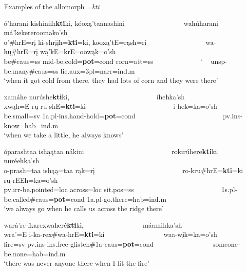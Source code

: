 \largerpage
\begin{exe}

\item\label{potentialkti} Examples of the allomorph =\textit{kti}

	\begin{xlist}
	
	\item\label{potentialkti1}
	\glll ó'harani kishiniih\textbf{kti}ki, kóoxą'taanashini ~ ~ ~ ~ ~ ~ ~ ~ ~ ~ wahų́harani má'kekereroomako'sh\\
	o'\#hrE=rį ki-shrįįh=\textbf{kti}=ki, kooxą'tE=rąsh=rį ~ ~ ~ ~ ~ ~ ~ ~ ~ ~ wa-hų\#hrE=rį wą'kE=krE=oowąk=o'sh\\
	\textnormal{be}\#caus=ss mid-\textnormal{be.cold}=\textbf{pot}=cond \textnormal{corn}=att=ss ~ ~ ~ ~ ~ ~ ~ ~ ` ~ unsp-\textnormal{be.many}\#caus=ss \textnormal{lie}.aux=3pl=narr=ind.m\\
	\glt `when it got cold from there, they had lots of corn and they were there' \citep[91]{hollow1973b}

	\item\label{potentialkti2}
	\glll xamáhe nurúshe\textbf{kti}ki, ~ ~ ~ ~ ~ ~ ~ ~ ~ ~ ~ ~ ~ ~ ~  íhehka'sh\\
	xwąh=E rų-ru-shE=\textbf{kti}=ki ~ ~ ~ ~ ~ ~ ~ ~ ~ ~ ~ ~ ~ ~ ~  i-hek=ka=o'sh\\
	\textnormal{be.small}=sv 1a.pl-ins.hand-\textnormal{hold}=\textbf{pot}=cond ~ ~ ~ ~ ~ ~ ~ ~ ~ ~ ~ ~ ~ ~ ~  pv.ins-\textnormal{know}=hab=ind.m\\
	\glt `when we take a little, he always knows' \citep[116]{hollow1973b}

	\item\label{potentialkti3}
	\glll óparashtaa ishąątaa nákini ~ ~ ~ ~ ~ ~ ~ ~ ~ ~ ~ ~ ~ ~ ~ rokirúhere\textbf{kti}ki, nuréehka'sh\\
	o-prash=taa ishąą=taa rąk=rį ~ ~ ~ ~ ~ ~ ~ ~ ~ ~ ~ ~ ~ ~ ~  ro-kru\#hrE=\textbf{kti}=ki rų-rEEh=ka=o'sh\\
	pv.irr-\textnormal{be.pointed}=loc \textnormal{across}=loc sit.pos=ss ~ ~ ~ ~ ~ ~ ~ ~ ~ ~ ~ ~ ~ ~ ~ 1s.pl-\textnormal{be.called}\#caus=\textbf{pot}=cond 1a.pl-\textnormal{go.there}=hab=ind.m\\
	\glt `we always go when he calls us across the ridge there' \citep[151]{hollow1973b}

	\item\label{potentialkti4}
	\glll wará're íkarexwaheré\textbf{kti}ki, ~ ~ ~ ~ ~ ~ ~ ~ ~ ~ máamihka'sh\\
	wra'=E i-ka-rex\#wa-hrE=\textbf{kti}=ki ~ ~ ~ ~ ~ ~ ~ ~ ~ ~ waa-wįk=ka=o'sh\\
	\textnormal{fire}=sv pv.ins-ins.frce-\textnormal{glisten}\#1a-caus=\textbf{pot}=cond ~ ~ ~ ~ ~ ~ ~ ~ ~ ~  \textnormal{someone}-\textnormal{be.none}=hab=ind.m\\
	\glt `there was never anyone there when I lit the fire' \citep[203]{hollow1973b}
	
	\end{xlist}

\end{exe}

